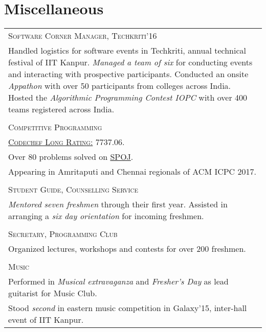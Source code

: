\documentclass[a4paper,10pt]{article}
\begin{document}
\section{Miscellaneous}
\begin{longtable}{p{13cm}}
\large \textsc{Software Corner Manager, Techkriti'16}\\
Handled logistics for software events in Techkriti, annual technical festival of IIT Kanpur. \textit{Managed a team of six} for conducting events and interacting with prospective participants. Conducted an onsite \textit{Appathon} with over 50 participants from colleges across India. Hosted the \textit{Algorithmic Programming Contest IOPC} with over 400 teams registered across India.\\ \\
\large \textsc{Competitive Programming}\\
\href{https://www.codechef.com/users/architsh}{\textsc{Codechef Long Rating:}} 7737.06.\\
Over 80 problems solved on \href{http://www.spoj.com/users/architsh/}{SPOJ}.\\
Appearing in Amritaputi and Chennai regionals of ACM ICPC 2017.\\ \\
\large \textsc{Student Guide, Counselling Service}\\
\textit{Mentored seven freshmen} through their first year. Assisted in arranging a \textit{six day orientation} for incoming freshmen.\\ \\
\large \textsc{Secretary, Programming Club}\\
Organized lectures, workshops and contests for over 200 freshmen.
\\ \\
\large \textsc{Music}\\
Performed in \textit{Musical extravaganza} and \textit{Fresher's Day} as lead guitarist for Music Club.\\
Stood \textit{second} in eastern music competition in Galaxy'15, inter-hall event of IIT Kanpur.
\end{longtable}
\end{document}
